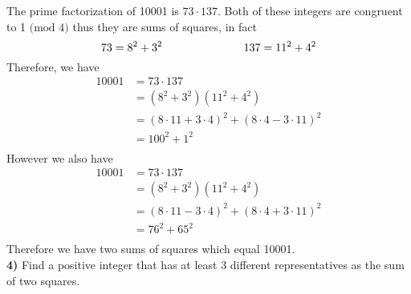 \documentclass{scrartcl}
\renewcommand{\mod}[1]{\text{ (mod $#1$)}}
\begin{document}
The prime factorization of 10001 is $73\cdot137$. Both of these integers are congruent to 1$\mod{4}$ thus they are sums of squares, in fact
$$73 = 8^2 + 3^2 \text{\hspace{1in}} 137 = 11^2 + 4^2$$
Therefore, we have
\begin{align*}
  10001 &= 73\cdot137\\
  &= \left(8^2 + 3^2\right)\left(11^2 + 4^2\right)\\
  &= \left(8\cdot11 + 3\cdot4\right)^2 + \left(8\cdot4 - 3\cdot11\right)^2\\
  &= 100^2 + 1^2\\
\end{align*}
However we also have
\begin{align*}
  10001 &= 73\cdot137\\
  &= \left(8^2 + 3^2\right)\left(11^2 + 4^2\right)\\
  &= \left(8\cdot11 - 3\cdot4\right)^2 + \left(8\cdot4 + 3\cdot11\right)^2\\
  &= 76^2 + 65^2\\
\end{align*}
Therefore we have two sums of squares which equal 10001.\\

\textbf{4)} Find a positive integer that has at least 3 different representatives as the sum of two squares.\\
\end{document}
